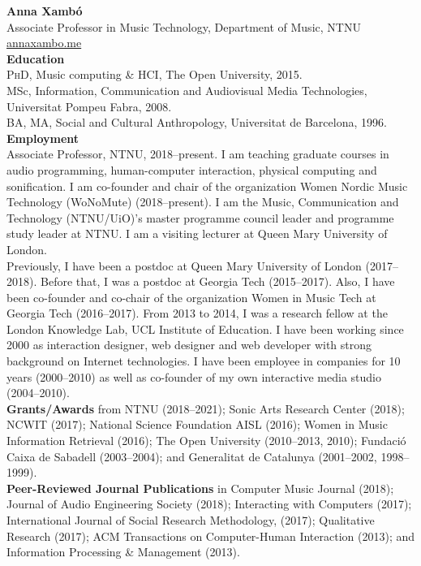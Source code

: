 \documentclass[10pt, a4paper]{article}
\begin{document}

{\textbf{Anna Xambó}}\\
Associate Professor in Music Technology, Department of Music, NTNU\\
\href{http://annaxambo.me/}{annaxambo.me}\\ 

{\textbf{Education}}\\
\textsc{PhD}, Music computing \& HCI, The Open University, 2015.\\
MSc, Information, Communication and Audiovisual Media Technologies, Universitat Pompeu Fabra, 2008.\\
BA, MA, Social and Cultural Anthropology, Universitat de Barcelona, 1996.\\

{\textbf{Employment}}\\
Associate Professor, NTNU, 2018--present. I am teaching graduate courses in audio programming, human-computer interaction, physical computing and sonification. I am co-founder and chair of the organization Women Nordic Music Technology (WoNoMute) (2018--present). I am the Music, Communication and Technology (NTNU/UiO)'s master programme council leader and programme study leader at NTNU. I am a visiting lecturer at Queen Mary University of London.\\
Previously, I have been a postdoc at Queen Mary University of London (2017--2018). Before that, I was a postdoc at Georgia Tech (2015--2017). Also, I have been co-founder and co-chair of the organization Women in Music Tech at Georgia Tech (2016--2017). From 2013 to 2014, I was a research fellow at the London Knowledge Lab, UCL Institute of Education.
I have been working since 2000 as interaction designer, web designer and web developer with strong background on Internet technologies. I have been employee in companies for 10 years (2000--2010) as well as co-founder of my own interactive media studio (2004--2010).\\

{\textbf{Grants/Awards}} from NTNU (2018--2021); Sonic Arts Research Center (2018); NCWIT (2017); National Science Foundation AISL (2016); Women in Music Information Retrieval (2016); The Open University (2010--2013, 2010); Fundació Caixa de Sabadell (2003--2004); and Generalitat de Catalunya (2001--2002, 1998--1999).\\

{\textbf{Peer-Reviewed Journal Publications}} in Computer Music Journal (2018); Journal of Audio Engineering Society (2018); Interacting with Computers (2017); International Journal of Social Research Methodology, (2017); Qualitative Research (2017); ACM Transactions on Computer-Human Interaction (2013); and Information Processing \& Management (2013).\\
\end{document}
